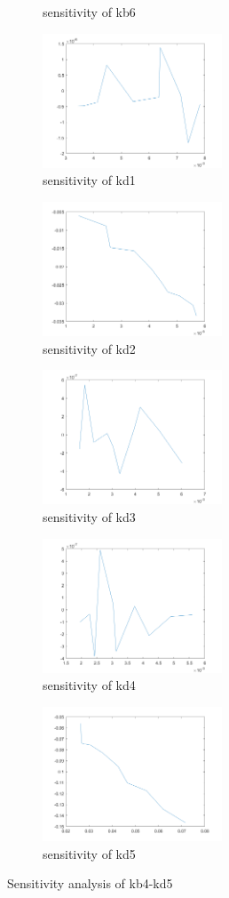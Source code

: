 \begin{figure}[H]
\begin{subfigure}{0.5\textwidth}
		\caption{sensitivity of kb6}
	\end{subfigure}%
	\begin{subfigure}{0.5\textwidth}
		\includegraphics[height=4cm]{d1.png}
		\caption{sensitivity of kd1}
	\end{subfigure}
	\begin{subfigure}{0.5\textwidth}
		\includegraphics[height=4cm]{d2.png}
		\caption{sensitivity of kd2}
	\end{subfigure}%
	\begin{subfigure}{0.5\textwidth}
		\includegraphics[height=4cm]{d3.png}
		\caption{sensitivity of kd3}
	\end{subfigure}
	\begin{subfigure}{0.5\textwidth}
		\includegraphics[height=4cm]{d4.png}
		\caption{sensitivity of kd4}
	\end{subfigure}%
	\begin{subfigure}{0.5\textwidth}
		\includegraphics[height=4cm]{d5.png}
		\caption{sensitivity of kd5}
	\end{subfigure}
	\caption{Sensitivity analysis of kb4-kd5}
	

\end{figure}
